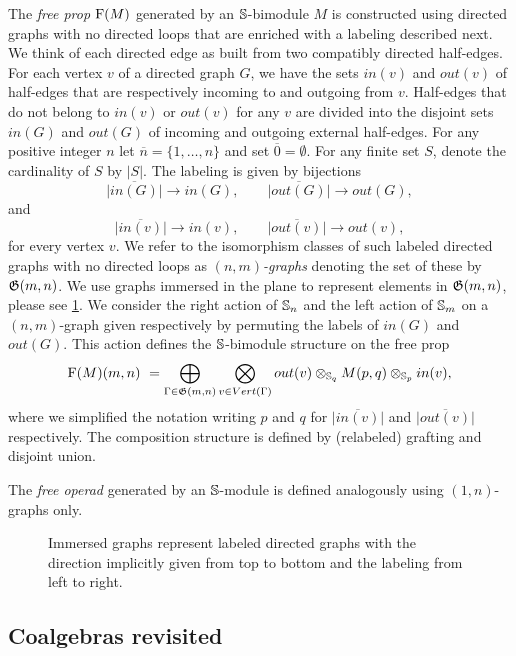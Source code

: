 The \textit{free prop} $\F(M)$ generated by an $\S$-bimodule $M$ is constructed using directed graphs with no directed loops that are enriched with a labeling described next.
We think of each directed edge as built from two compatibly directed half-edges.
For each vertex $v$ of a directed graph $G$, we have the sets $in(v)$ and $out(v)$ of half-edges that are respectively incoming to and outgoing from $v$.
Half-edges that do not belong to $in(v)$ or $out(v)$ for any $v$ are divided into the disjoint sets $in(G)$ and $out(G)$ of incoming and outgoing external half-edges.
For any positive integer $n$ let $\overline{n} = \{1, \dots, n\}$ and set $\overline{0} = \emptyset$.
For any finite set $S$, denote the cardinality of $S$ by $|S|$.
The labeling is given by bijections  
\[
\overline{|in(G)|}\to in(G), \qquad
\overline{|out(G)|}\to out(G),
\]
and
\[
\overline{|in(v)|}\to in(v), \qquad
\overline{|out(v)|}\to out(v),
\]
for every vertex $v$.
We refer to the isomorphism classes of such labeled directed graphs with no directed loops as $(n,m)$\textit{-graphs} denoting the set of these by $\G(m,n)$.
We use graphs immersed in the plane to represent elements in $\G(m,n)$, please see \cref{f:immersion}.
We consider the right action of $\S_n$ and the left action of $\S_m$ on a $(n,m)$-graph given respectively by permuting the labels of $in(G)$ and $out(G)$.
This action defines the $\S$-bimodule structure on the free prop
\begin{equation} \label{e:free prop}
\F(M)(m,n) \ = \bigoplus_{\Gamma \in \G(m,n)} \bigotimes_{v \in Vert(\Gamma)} out(v) \otimes_{\S_q} M(p, q) \otimes_{\S_p} in(v),
\end{equation}
where we simplified the notation writing $p$ and $q$ for $\overline{|in(v)|}$ and $\overline{|out(v)|}$ respectively.
The composition structure is defined by (relabeled) grafting and disjoint union.

The \textit{free operad} generated by an $\S$-module is defined analogously using $(1,n)$-graphs only.

\begin{figure}
	
	\caption{Immersed graphs represent labeled directed graphs with the direction implicitly given from top to bottom and the labeling from left to right.}
	\label{f:immersion}
\end{figure}

\subsection{Coalgebras revisited}

